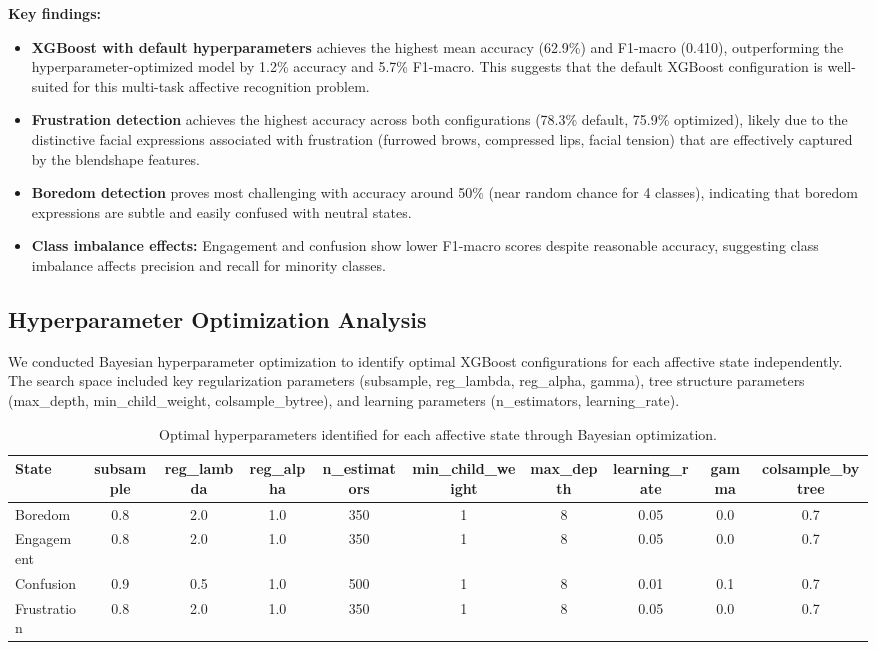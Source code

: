 \textbf{Key findings:}
\begin{itemize}
    \item \textbf{XGBoost with default hyperparameters} achieves the highest mean accuracy (62.9\%) and F1-macro (0.410), outperforming the hyperparameter-optimized model by 1.2\% accuracy and 5.7\% F1-macro. This suggests that the default XGBoost configuration is well-suited for this multi-task affective recognition problem.

    \item \textbf{Frustration detection} achieves the highest accuracy across both configurations (78.3\% default, 75.9\% optimized), likely due to the distinctive facial expressions associated with frustration (furrowed brows, compressed lips, facial tension) that are effectively captured by the blendshape features.

    \item \textbf{Boredom detection} proves most challenging with accuracy around 50\% (near random chance for 4 classes), indicating that boredom expressions are subtle and easily confused with neutral states.

    \item \textbf{Class imbalance effects:} Engagement and confusion show lower F1-macro scores despite reasonable accuracy, suggesting class imbalance affects precision and recall for minority classes.
\end{itemize}

\subsection{Hyperparameter Optimization Analysis}
\label{sec:hyperparameter-optimization}

We conducted Bayesian hyperparameter optimization to identify optimal XGBoost configurations for each affective state independently. The search space included key regularization parameters (subsample, reg\_lambda, reg\_alpha, gamma), tree structure parameters (max\_depth, min\_child\_weight, colsample\_bytree), and learning parameters (n\_estimators, learning\_rate).

\begin{table}[t]
\centering
\caption{Optimal hyperparameters identified for each affective state through Bayesian optimization.}
\label{tab:optimal-hyperparams}
\begin{tabular}{lccccccccc}
\toprule
\textbf{State} & subsample & reg\_lambda & reg\_alpha & n\_estimators & min\_child\_weight & max\_depth & learning\_rate & gamma & colsample\_bytree \\
\midrule
Boredom & 0.8 & 2.0 & 1.0 & 350 & 1 & 8 & 0.05 & 0.0 & 0.7 \\
Engagement & 0.8 & 2.0 & 1.0 & 350 & 1 & 8 & 0.05 & 0.0 & 0.7 \\
Confusion & 0.9 & 0.5 & 1.0 & 500 & 1 & 8 & 0.01 & 0.1 & 0.7 \\
Frustration & 0.8 & 2.0 & 1.0 & 350 & 1 & 8 & 0.05 & 0.0 & 0.7 \\
\bottomrule
\end{tabular}
\end{table}

